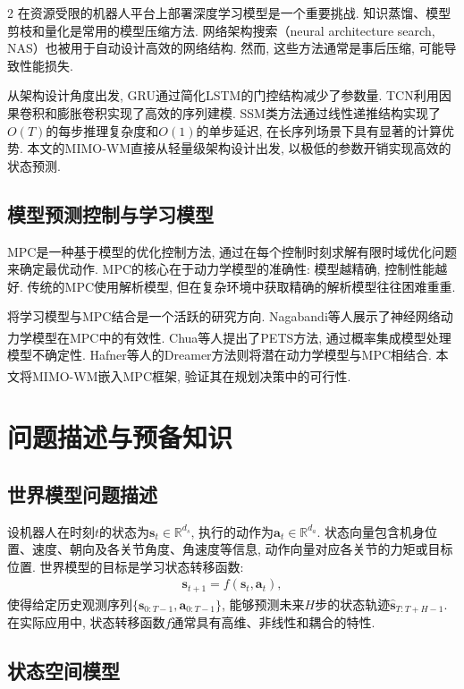 \begin{multicols}{2}
在资源受限的机器人平台上部署深度学习模型是一个重要挑战.
知识蒸馏、模型剪枝和量化是常用的模型压缩方法.
网络架构搜索（neural architecture search, NAS）也被用于自动设计高效的网络结构.
然而, 这些方法通常是事后压缩, 可能导致性能损失.

从架构设计角度出发, GRU通过简化LSTM的门控结构减少了参数量.
TCN利用因果卷积和膨胀卷积实现了高效的序列建模.
SSM类方法通过线性递推结构实现了$O(T)$的每步推理复杂度和$O(1)$的单步延迟,
在长序列场景下具有显著的计算优势.
本文的MIMO-WM直接从轻量级架构设计出发, 以极低的参数开销实现高效的状态预测.

\subsection{模型预测控制与学习模型}

MPC是一种基于模型的优化控制方法,
通过在每个控制时刻求解有限时域优化问题来确定最优动作.
MPC的核心在于动力学模型的准确性: 模型越精确, 控制性能越好.
传统的MPC使用解析模型, 但在复杂环境中获取精确的解析模型往往困难重重.

将学习模型与MPC结合是一个活跃的研究方向.
Nagabandi等人展示了神经网络动力学模型在MPC中的有效性.
Chua等人\textsuperscript{\cite{24}}提出了PETS方法, 通过概率集成模型处理模型不确定性.
Hafner等人的Dreamer方法则将潜在动力学模型与MPC相结合.
本文将MIMO-WM嵌入MPC框架, 验证其在规划决策中的可行性\textsuperscript{\cite{25}}.

\section{问题描述与预备知识}

\subsection{世界模型问题描述}

设机器人在时刻$t$的状态为${\bm s}_t \in \mathbb{R}^{d_s}$, 执行的动作为${\bm a}_t \in \mathbb{R}^{d_a}$.
状态向量包含机身位置、速度、朝向及各关节角度、角速度等信息, 动作向量对应各关节的力矩或目标位置.
世界模型的目标是学习状态转移函数:
\begin{eqnarray}
{\bm s}_{t+1} = f({\bm s}_t, {\bm a}_t),
\end{eqnarray}
使得给定历史观测序列$\{{\bm s}_{0:T-1}, {\bm a}_{0:T-1}\}$,
能够预测未来$H$步的状态轨迹$\hat{{\bm s}}_{T:T+H-1}$.
在实际应用中, 状态转移函数$f$通常具有高维、非线性和耦合的特性.

\subsection{状态空间模型}


\end{multicols}
